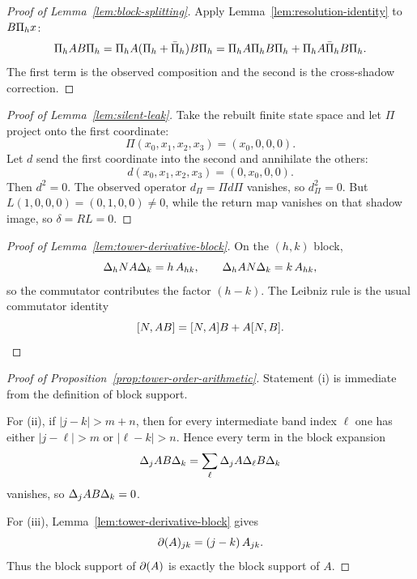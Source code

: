 \label{sec:appendix-tower}


\begin{proof}[Proof of Lemma~\ref{lem:block-splitting}]
\label{proof:lem:block-splitting}
Apply Lemma~\ref{lem:resolution-identity} to $B\Pi_{h}x$:
\[
\Pi_{h}AB\Pi_{h}
=
\Pi_{h}A(\Pi_{h} + \bar{\Pi}_{h})B\Pi_{h}
=
\Pi_{h}A\Pi_{h}B\Pi_{h} + \Pi_{h}A\bar{\Pi}_{h}B\Pi_{h}.
\]
The first term is the observed composition and the second is the cross-shadow correction.
\end{proof}


\begin{proof}[Proof of Lemma~\ref{lem:silent-leak}]
\label{proof:lem:silent-leak}
Take the rebuilt finite state space and let $\Pi$ project onto the first coordinate:
\[
\Pi(x_0,x_1,x_2,x_3) = (x_0,0,0,0).
\]
Let $d$ send the first coordinate into the second and annihilate the others:
\[
d(x_0,x_1,x_2,x_3) = (0,x_0,0,0).
\]
Then $d^2 = 0$. The observed operator $d_\Pi = \Pi d \Pi$ vanishes, so $d_\Pi^2 = 0$.
But $L(1,0,0,0) = (0,1,0,0) \neq 0$, while the return map vanishes on that shadow image, so $\delta = RL = 0$.
\end{proof}


\begin{proof}[Proof of Lemma~\ref{lem:tower-derivative-block}]
\label{proof:lem:tower-derivative-block}
On the $(h,k)$ block,
\[
\Delta_h N A \Delta_k = h\, A_{h k},
\qquad
\Delta_h A N \Delta_k = k\, A_{h k},
\]
so the commutator contributes the factor $(h-k)$. The Leibniz rule is the
usual commutator identity
\[
[N, AB] = [N, A]B + A[N, B].
\]
\end{proof}

\begin{proof}[Proof of Proposition~\ref{prop:tower-order-arithmetic}]
\label{proof:prop:tower-order-arithmetic}
Statement (i) is immediate from the definition of block support.

For (ii), if $|j-k|>m+n$, then for every intermediate band index $\ell$ one has
either $|j-\ell|>m$ or $|\ell-k|>n$. Hence every term in the block expansion
\[
\Delta_{j}AB\Delta_{k}
=
\sum_{\ell}\Delta_{j}A\Delta_{\ell}B\Delta_{k}
\]
vanishes, so $\Delta_{j}AB\Delta_{k}=0$.

For (iii), Lemma~\ref{lem:tower-derivative-block} gives
\[
\partial(A)_{j k}=(j-k)\,A_{j k}.
\]
Thus the block support of $\partial(A)$ is exactly the block support of $A$.
\end{proof}

